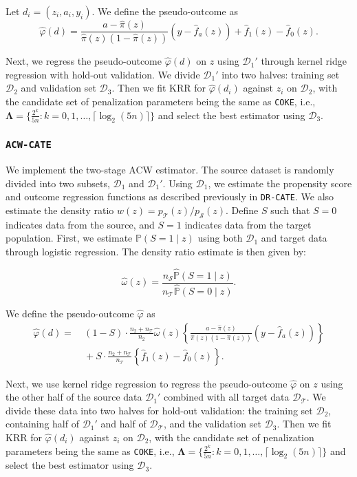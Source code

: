 \documentclass[12pt,a4paper,pdftex,onepage]{article}
\begin{document}
Let $d_i = (z_i, a_i, y_i)$. We define the pseudo-outcome as $$\widehat\varphi(d)=\frac{a-\hat \pi(z)}{\hat \pi(z)(1-\hat \pi(z))}(y-\hat f_a(z))+\hat f_1(z)-\hat f_0(z).$$

Next, we regress the pseudo-outcome $\widehat\varphi(d)$ on $z$ using $\mathcal{D}_1'$ through kernel ridge regression with hold-out validation. We divide $\mathcal{D}_1'$ into two halves: training set $\mathcal{D}_2$ and validation set $\mathcal{D}_3$. Then we fit KRR for $\widehat\varphi(d_i)$ against $z_i$ on $\mathcal{D}_2$, with the candidate set of penalization parameters being the same as \texttt{COKE}, i.e., ${\bm \Lambda} = \{\frac{2^k}{5n} : k = 0, 1, \ldots, \lceil\log_2(5n)\rceil\}$ and select the best estimator using $\mathcal{D}_3$.



\subsubsection{\texttt{ACW-CATE}}

We implement the two-stage ACW estimator. The source dataset is randomly divided into two subsets, $\mathcal{D}_1$ and $\mathcal{D}_1'$. Using $\mathcal{D}_1$, we estimate the propensity score and outcome regression functions as described previously in \texttt{DR-CATE}. We also estimate the density ratio $w(z) = p_\mathcal{T}(z)/p_\mathcal{S}(z)$. Define $S$ such that $S = 0$ indicates data from the source, and $S = 1$ indicates data from the target population. First, we estimate $\mathbb{P}(S = 1 \mid z)$ using both $\mathcal{D}_1$ and target data through logistic regression. The density ratio estimate is then given by:

\[
\widehat\omega(z) = \frac{n_\mathcal{S} \widehat{\mathbb{P}}(S = 1 \mid z)}{n_\mathcal{T} \widehat{\mathbb{P}}(S = 0 \mid z)}.
\]

We define the pseudo-outcome $\widehat\varphi$ as
$$\begin{aligned}\widehat\varphi(d)=&\ (1-S)\cdot\frac{n_2+n_\mathcal{T}}{n_2}\widehat\omega(z)\left\{\frac{a-\hat \pi(z)}{\hat \pi(z)(1-\hat \pi(z))}(y-\hat f_a(z))\right\}\\&\ +S\cdot\frac{n_2+n_\mathcal{T}}{n_\mathcal{T}}\left\{\hat f_1(z)-\hat f_0(z)\right\}.\end{aligned}$$

Next, we use kernel ridge regression to regress the pseudo-outcome $\widehat\varphi$ on $z$ using the other half of the source data $\mathcal{D}_1'$ combined with all target data $\mathcal{D}_\mathcal{T}$. We divide these data into two halves for hold-out validation: the training set $\mathcal{D}_2$, containing half of $\mathcal{D}_1'$ and half of $\mathcal{D}_\mathcal{T}$, and the validation set $\mathcal{D}_3$. Then we fit KRR for $\widehat\varphi(d_i)$ against $z_i$ on $\mathcal{D}_2$, with the candidate set of penalization parameters being the same as \texttt{COKE}, i.e., ${\bm \Lambda} = \{\frac{2^k}{5n} : k = 0, 1, \ldots, \lceil\log_2(5n)\rceil\}$ and select the best estimator using $\mathcal{D}_3$.
\end{document}
